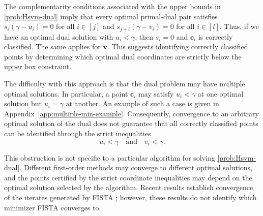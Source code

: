 \documentclass[twoside,11pt]{article}
\renewcommand{\c}{\bm{c}}
\renewcommand\v{\bm{v}}
\begin{document}
The complementarity conditions associated with the upper bounds in \eqref{prob:Hsvm-dual} imply that every optimal primal-dual pair satisfies $s_i(\gamma - u_i) = 0$ for all $i \in [j]$ and
$s_{j+i}(\gamma - v_i) = 0$ for all $i \in [l]$. Thus, if we have an optimal dual solution with $u_i < \gamma$, then $s_i = 0$ and $\c_i$ is
correctly classified. The same applies for $\v$. This suggests identifying correctly classified points by determining which optimal dual coordinates are strictly below the upper box constraint.

The difficulty with this approach is that the dual problem may have multiple optimal solutions. In particular, a point $\c_i$ may satisfy $u_i < \gamma$ at one optimal solution but $u_i = \gamma$ at another. An example of such a case is given in Appendix~\ref{app:multiple-min-example}. Consequently, convergence to an arbitrary optimal solution of the dual does not guarantee that all correctly classified points can be identified through the strict inequalities
\[
    u_i < \gamma\quad\text{and}\quad v_i < \gamma.
\]

This obstruction is not specific to a particular algorithm for solving \eqref{prob:Hsvm-dual}. Different first-order methods may converge to different optimal solutions, and the points certified by the strict coordinate inequalities may depend on the optimal solution selected by the algorithm. Recent results establish convergence of the iterates generated by FISTA \citep{Bot2025}; however, these results do not identify which minimizer FISTA converges to.
\end{document}
